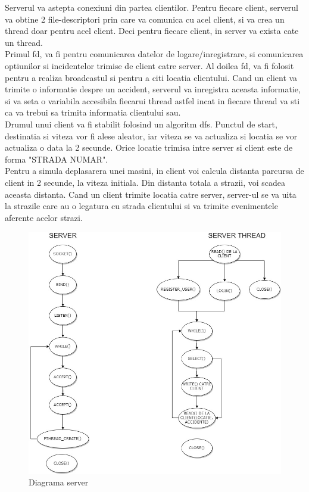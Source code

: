 \documentclass[runningheads]{llncs}
\begin{document}
Serverul va astepta conexiuni din partea clientilor. Pentru fiecare client, serverul va obtine 2 file-descriptori prin care va comunica cu acel client, si va crea un thread doar pentru acel client. Deci pentru fiecare client, in server va exista cate un thread.\\

Primul fd, va fi pentru comunicarea datelor de logare/inregistrare, si comunicarea optiunilor si incidentelor trimise de client catre server. Al doilea fd, va fi folosit pentru a realiza broadcastul si pentru a citi locatia clientului. Cand un client va trimite o informatie despre un accident, serverul va inregistra aceasta informatie, si va seta o variabila accesibila fiecarui thread astfel incat in fiecare thread va sti ca va trebui sa trimita informatia clientului sau.\\

Drumul unui client va fi stabilit folosind un algoritm dfs. Punctul de start, destinatia si viteza vor fi alese aleator, iar viteza se va actualiza si locatia se vor actualiza o data la 2 secunde. Orice locatie trimisa intre server si client este de forma "STRADA NUMAR". \\

Pentru a simula deplasarera unei masini, in client voi calcula distanta parcursa de client in 2 secunde, la viteza initiala. Din distanta totala a strazii, voi scadea aceasta distanta. Cand un client trimite locatia catre server, server-ul se va uita la strazile care au o legatura cu strada clientului si va trimite evenimentele aferente acelor strazi.

\begin{figure}[H]
\includegraphics[width=\textwidth]{SERVER_SERVER_THREAD.jpg}
\caption{Diagrama server}
\end{figure}
\end{document}
